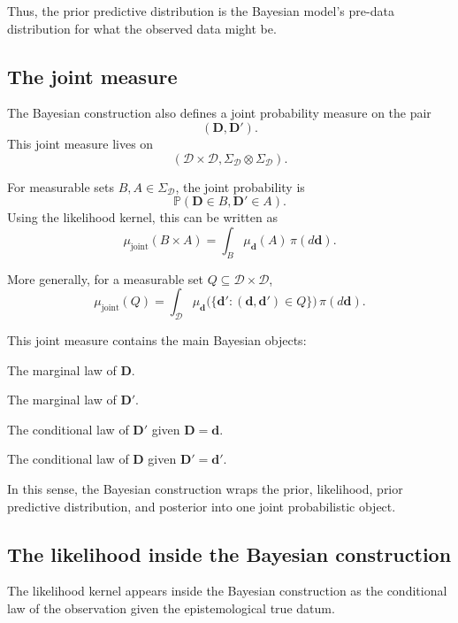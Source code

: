 \documentclass[11pt]{article}
\newcommand{\Dspace}{\mathcal D}
\newcommand{\SigmaD}{\Sigma_{\mathcal D}}
\newcommand{\prior}{\pi}
\newcommand{\Drand}{\mathbf D}
\newcommand{\Dobsrand}{\mathbf D'}
\newcommand{\Prob}{\mathbb P}
\begin{document}
Thus, the prior predictive distribution is the Bayesian model's pre-data distribution for what the observed data might be.

\subsection{The joint measure}

The Bayesian construction also defines a joint probability measure on the pair
\[
    (\Drand,\Dobsrand).
\]
This joint measure lives on
\[
    (\Dspace\times\Dspace,\SigmaD\otimes\SigmaD).
\]

For measurable sets \(B,A\in\SigmaD\), the joint probability is
\[
    \Prob(\Drand\in B,\Dobsrand\in A).
\]
Using the likelihood kernel, this can be written as
\[
    \mu_{\mathrm{joint}}(B\times A)
    =
    \int_B
        \mu_{\mathbf d}(A)
    \,\prior(d\mathbf d).
\]

More generally, for a measurable set \(Q\subseteq\Dspace\times\Dspace\),
\[
    \mu_{\mathrm{joint}}(Q)
    =
    \int_{\Dspace}
        \mu_{\mathbf d}
        \bigl(
            \{\mathbf d':(\mathbf d,\mathbf d')\in Q\}
        \bigr)
    \,\prior(d\mathbf d).
\]

This joint measure contains the main Bayesian objects:
\begin{description}[leftmargin=3.1cm,style=nextline]
    \item[Prior.]
    The marginal law of \(\Drand\).

    \item[Prior predictive.]
    The marginal law of \(\Dobsrand\).

    \item[Likelihood kernel.]
    The conditional law of \(\Dobsrand\) given \(\Drand=\mathbf d\).

    \item[Posterior kernel.]
    The conditional law of \(\Drand\) given \(\Dobsrand=\mathbf d'\).
\end{description}

In this sense, the Bayesian construction wraps the prior, likelihood, prior predictive distribution, and posterior into one joint probabilistic object.

\subsection{The likelihood inside the Bayesian construction}

The likelihood kernel appears inside the Bayesian construction as the conditional law of the observation given the epistemological true datum.
\end{document}

